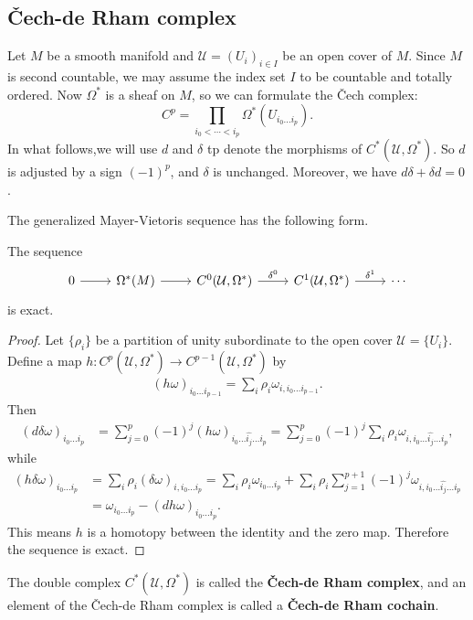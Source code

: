 \subsection{\v{C}ech-de Rham complex}
Let $M$ be a smooth manifold and $\mathcal{U}=(U_i)_{i\in I}$ be an open cover of $M$. Since $M$ is second countable, we may assume the index set $I$ to be countable and 
totally ordered. Now $\Omega^*$ is a sheaf on $M$, so we can formulate the \v{C}ech complex:
\[C^p=\prod_{i_0<\cdots<i_p}\Omega^*(U_{i_0\dots i_p}).\]
In what follows,we will use $d$ and $\delta$ tp denote the morphisms of $C^*(\mathcal{U},\Omega^*)$. So $d$ is adjusted by a sign $(-1)^p$, and $\delta$ is unchanged. 
Moreover, we have $d\delta+\delta d=0$.\par
The generalized Mayer-Vietoris sequence has the following form.
\begin{proposition}\label{de Rham MV generalized}
The sequence
\[\begin{tikzcd}
0\ar[r]&\Omega^*(M)\ar[r]&C^0(\mathcal{U},\Omega^*)\ar[r,"\delta^0"]&C^1(\mathcal{U},\Omega^*)\ar[r,"\delta^1"]&\cdots
\end{tikzcd}\]
is exact.
\end{proposition}
\begin{proof}
Let $\{\rho_i\}$ be a partition of unity subordinate to the open cover $\mathcal{U}=\{U_i\}$. Define a map $h:C^p(\mathcal{U},\Omega^*)\to C^{p-1}(\mathcal{U},\Omega^*)$ 
by
\begin{align}\label{de Rham MV generalized homotopy}
(h\omega)_{i_0\dots i_{p-1}}=\sum_i\rho_i\omega_{i,i_0\dots i_{p-1}}.
\end{align}
Then
\begin{align*}
(d\delta\omega)_{i_0\dots i_p}&=\sum_{j=0}^{p}(-1)^j(h\omega)_{i_0\dots\widehat{i_j}\dots i_p}=\sum_{j=0}^{p}(-1)^j\sum_i\rho_i\omega_{i,i_0\dots\widehat{i_j}\dots i_p},
\end{align*}
while
\begin{align*}
(h\delta\omega)_{i_0\dots i_p}&=\sum_i\rho_i(\delta\omega)_{i,i_0\dots i_{p}}=\sum_i\rho_i\omega_{i_0\dots i_p}+\sum_i\rho_i\sum_{j=1}^{p+1}(-1)^j\omega_{i,i_0\dots\widehat{i_j}\dots i_p}\\
&=\omega_{i_0\dots i_p}-(dh\omega)_{i_0\dots i_p}.
\end{align*}
This means $h$ is a homotopy between the identity and the zero map. Therefore the sequence is exact.
\end{proof}
The double complex $C^*(\mathcal{U},\Omega^*)$ is called the \textbf{\v{C}ech-de Rham complex}, and an element of the \v{C}ech-de Rham complex is called a \textbf{\v{C}ech-de Rham 
cochain}.\par
